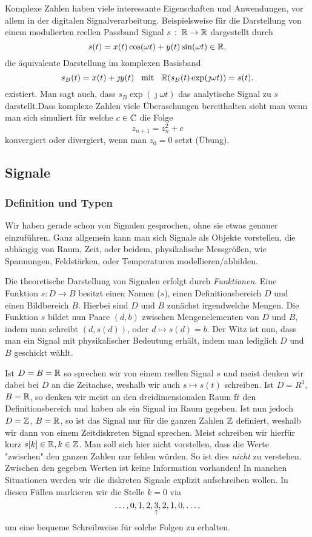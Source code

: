 Komplexe Zahlen haben viele interessante Eigenschaften und Anwendungen, vor allem in der digitalen Signalverarbeitung.
Beispielsweise f\"ur die Darstellung von einem modulierten reellen Passband Signal $s \hspace{0.5mm}:\hspace{1.0mm} \mathbb{R} \rightarrow \mathbb{R}$ dargestellt durch
\[
s(t) = x(t)\cos(\omega t) + y(t)\sin(\omega t) \in \mathbb{R},
\]
die \"aquivalente Darstellung im komplexen Basisband
\[
s_B(t) = x(t) + \jmath y(t) {\hspace{3mm} \text{mit} \hspace{3mm}} \mathbb{R}(s_B(t)\exp(\jmath \omega t)) = s(t).
\]
existiert. Man sagt auch, dass $s_B \exp(\jmath \omega t)$ das analytische Signal zu $s$ darstellt.Dass komplexe Zahlen viele \"Uberaschungen bereithalten sieht man wenn man sich simuliert f\"ur welche $c \in \mathbb{C}$ die Folge
\[
z_{n+1} = z_{n}^2 + c
\]
konvergiert oder divergiert, wenn man $z_0 = 0$ setzt (\"Ubung). 
%
%
\subsection{Signale}
%
\subsubsection{Definition und Typen}
%
Wir haben gerade schon von Signalen gesprochen, ohne sie etwas genauer einzuf\"uhren. 
Ganz allgemein kann man sich Signale als Objekte vorstellen, die abh\"angig von Raum, Zeit, oder beidem, physikalische Messgr\"o\ss{}en, wie Spannungen, Feldst\"arken, oder Temperaturen modellieren/abbilden.

Die theoretische Darstellung von Signalen erfolgt durch \emph{Funktionen}.
Eine Funktion $s : D \rightarrow B$ besitzt einen Namen ($s$), einen Definitionsbereich $D$ und einen Bildbereich $B$.
Hierbei sind $D$ und $B$ zun\"achst irgendwelche Mengen. 
Die Funktion $s$ bildet nun Paare $(d,b)$ zwischen Mengenelementen von $D$ und $B$, indem man schreibt $(d, s(d))$, oder $d \mapsto s(d) = b$.
Der Witz ist nun, dass man ein Signal mit physikalischer Bedeutung erh\"alt, indem man lediglich $D$ und $B$ geschickt w\"ahlt.

Ist $D = B = \mathbb{R}$ so sprechen wir von einem reellen Signal $s$ und meist denken wir dabei bei $D$ an die Zeitachse, weshalb wir auch $s \mapsto s(t)$ schreiben. 
Ist $D = R^3$, $B = \mathbb{R}$, so denken wir meist an den dreidimensionalen Raum f\"r den Definitionsbereich und haben als ein Signal im Raum gegeben.
Ist nun jedoch $D = \mathbb{Z}$, $B = \mathbb{R}$, so ist das Signal nur f\"ur die ganzen Zahlen $\mathbb{Z}$ definiert, weshalb wir dann von einem Zeitdiskreten Signal sprechen.
Meist schreiben wir hierf\"ur kurz $s[k] \in \mathbb{R}, k\in \mathbb{Z}$.
Man soll sich hier nicht vorstellen, dass die Werte "zwischen" den ganzen Zahlen nur fehlen w\"urden. 
So ist dies \emph{nicht} zu verstehen. 
Zwischen den gegeben Werten ist keine Information vorhanden!
In manchen Situationen werden wir die diskreten Signale explizit aufschreiben wollen. 
In diesen F\"allen markieren wir die Stelle $k = 0$ via
\[
\dots, 0, 1, 2, \underset{\uparrow}{3}, 2, 1, 0, \dots,
\]
um eine bequeme Schreibweise f\"ur solche Folgen zu erhalten. 


